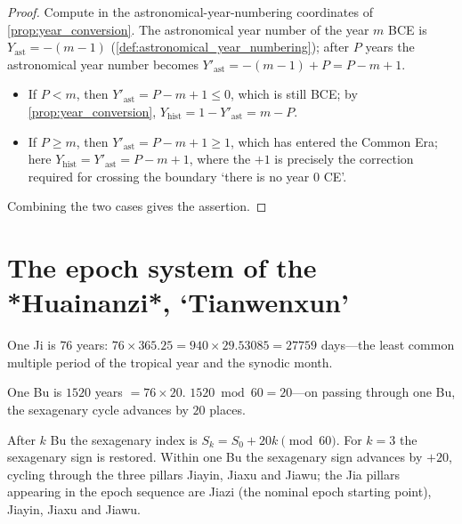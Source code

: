 \begin{proof}
Compute in the astronomical-year-numbering coordinates of \cref{prop:year_conversion}. The astronomical year number of the year \(m\) BCE is \(Y_{\text{ast}}=-(m-1)\) (\cref{def:astronomical_year_numbering}); after \(P\) years the astronomical year number becomes \(Y'_{\text{ast}}=-(m-1)+P=P-m+1\).
\begin{itemize}
\item If \(P<m\), then \(Y'_{\text{ast}}=P-m+1\le 0\), which is still BCE; by \cref{prop:year_conversion}, \(Y_{\text{hist}}=1-Y'_{\text{ast}}=m-P\).
\item If \(P\ge m\), then \(Y'_{\text{ast}}=P-m+1\ge 1\), which has entered the Common Era; here \(Y_{\text{hist}}=Y'_{\text{ast}}=P-m+1\), where the \(+1\) is precisely the correction required for crossing the boundary `there is no year \(0\) CE'.
\end{itemize}
Combining the two cases gives the assertion.
\end{proof}

\section{The epoch system of the *Huainanzi*, `Tianwenxun'}
\label{sec:huainanzi}

\begin{definition}[One Ji]\label{def:yiji}
One Ji is \(76\) years: \(76\times 365.25=940\times 29.53085=27759\) days---the least common multiple period of the tropical year and the synodic month.
\end{definition}

\begin{definition}\label{def:yibu}
One Bu is \(1520\) years \(=76\times 20\). \(1520\bmod 60=20\)---on passing through one Bu, the sexagenary cycle advances by \(20\) places.
\end{definition}

\begin{theorem}\label{thm:yibu_ganzhi_shift}
After \(k\) Bu the sexagenary index is \(S_k=S_0+20k\pmod{60}\). For \(k=3\) the sexagenary sign is restored. Within one Bu the sexagenary sign advances by \(+20\), cycling through the three pillars Jiayin, Jiaxu and Jiawu; the Jia pillars appearing in the epoch sequence are Jiazi (the nominal epoch starting point), Jiayin, Jiaxu and Jiawu.
\end{theorem}

